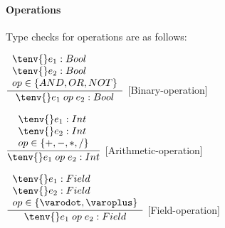 \paragraph{Operations}  Type checks for operations are as follows: \bigskip

\hspace*{10em}
$
\dfrac
{
\begin{array}{l}
	{\tenv{} e_1: Bool} \\
	{\tenv{} e_2: Bool} \\
	op \in \{AND, OR, NOT\}
\end{array}
}
{\tenv{} e_1 \; op \; e_2 : Bool}
$
[Binary-operation]\bigskip

\hspace*{10em}
$
\dfrac
{
\begin{array}{l}
	{\tenv{} e_1: Int} \\
	{\tenv{} e_2: Int} \\
	op \in \{+, -, *, /\}
\end{array}
}
{\tenv{} e_1 \; op \; e_2 : Int}
$
[Arithmetic-operation]\bigskip

\hspace*{10em}
$
\dfrac
{
\begin{array}{l}
	{\tenv{} e_1: Field} \\
	{\tenv{} e_2: Field} \\
	op \in \{ \varodot, \varoplus \}
\end{array}
}
{\tenv{} e_1 \; op \; e_2 : Field}
$
[Field-operation]\bigskip
